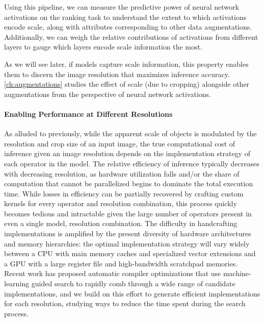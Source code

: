 Using this pipeline, we can measure the predictive power of neural network activations on the ranking task to understand the extent to which activations encode scale, along with attributes corresponding to other data augmentations.
Additionally, we can weigh the relative contributions of activations from different layers to gauge which layers encode scale information the most.

As we will see later, if models capture scale information, this property enables them to discern the image resolution that maximizes inference accuracy.
\autoref{ch:augmentations} studies the effect of scale (due to cropping) alongside other augmentations from the perspective of neural network activations.

\paragraph{Enabling Performance at Different Resolutions}
As alluded to previously, while the apparent scale of objects is modulated by the resolution and crop size of an input image, the true computational cost of inference given an image resolution depends on the implementation strategy of each operator in the model.
The relative efficiency of inference typically decreases with decreasing resolution, as hardware utilization falls and/or the share of computation that cannot be parallelized begins to dominate the total execution time.
While losses in efficiency can be partially recovered by crafting custom kernels for every operator and resolution combination, this process quickly becomes tedious and intractable given the large number of operators present in even a single model, resolution combination.
The difficulty in handcrafting implementations is amplified by the present diversity of hardware architectures and memory hierarchies: the optimal implementation strategy will vary widely between a CPU with main memory caches and specialized vector extensions and a GPU with a large register file and high-bandwidth scratchpad memories.
Recent work has proposed automatic compiler optimizations that use machine-learning guided search to rapidly comb through a wide range of candidate implementations, and we build on this effort to generate efficient implementations for each resolution, studying ways to reduce the time spent during the search process.

